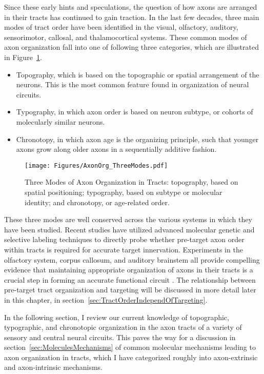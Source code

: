 Since these early hints and speculations, the question of how axons are arranged in their tracts has continued to gain traction.
In the last few decades, three main modes of tract order have been identified in the visual, olfactory, auditory, sensorimotor, callosal, and thalamocortical systems.
These common modes of axon organization fall into one of following three categories, which are illustrated in Figure~\ref{AxonOrg_ThreeModes}.
\begin{itemize}
\item Topography, which is based on the topographic or spatial arrangement of the neurons. This is the most common feature found in organization of neural circuits.
\item Typography, in which axon order is based on neuron subtype, or cohorts of molecularly similar neurons.
\item Chronotopy, in which axon age is the organizing principle, such that younger axons grow along older axons in a sequentially additive fashion.
\end{itemize}
\begin{figure}[hbtp]
    \begin{center}
    \texttt{[image: Figures/AxonOrg\_ThreeModes.pdf]}
    \caption[Three Modes of Axon Organization in Tracts]{Three Modes of Axon Organization in Tracts: topography, based on spatial positioning; typography, based on subtype or molecular identity; and chronotopy, or age-related order. \label{AxonOrg_ThreeModes}}
    \end{center}
\end{figure}
These three modes are well conserved across the various systems in which they have been studied.
Recent studies have utilized advanced molecular genetic and selective labeling techniques to directly probe whether pre-target axon order within tracts is required for accurate target innervation.
Experiments in the olfactory system, corpus callosum, and auditory brainstem all provide compelling evidence that maintaining appropriate organization of axons in their tracts is a crucial step in forming an accurate functional circuit \cite{imai2009pre,zhou2013axon,michalski2013robo3}.
The relationship between pre-target tract organization and targeting will be discussed in more detail later in this chapter, in section~\ref{sec:TractOrderIndependOfTargeting}.

In the following section, I review our current knowledge of topographic, typographic, and chronotopic organization in the axon tracts of a variety of sensory and central neural circuits.
This paves the way for a discussion in section~\ref{sec:MoleculesMechanisms} of common molecular mechanisms leading to axon organization in tracts, which I have categorized roughly into axon-extrinsic and axon-intrinsic mechanisms.
